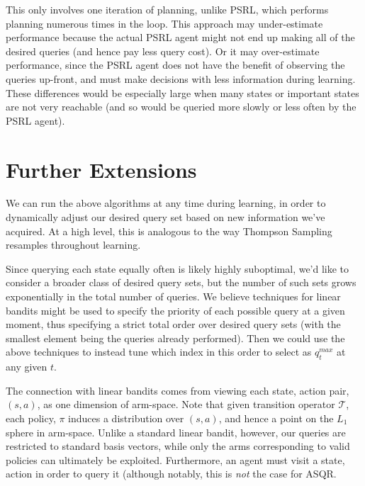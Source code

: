 \documentclass{article}
\begin{document}
This only involves one iteration of planning, unlike PSRL, which performs planning numerous times in the loop.
This approach may under-estimate performance because the actual PSRL agent might not end up making all of the desired queries (and hence pay less query cost).
Or it may over-estimate performance, since the PSRL agent does not have the benefit of observing the queries up-front, and must make decisions with less information during learning.
These differences would be especially large when many states or important states are not very reachable (and so would be queried more slowly or less often by the PSRL agent).

\section{Further Extensions}
We can run the above algorithms at any time during learning, in order to dynamically adjust our desired query set based on new information we've acquired.
At a high level, this is analogous to the way Thompson Sampling resamples throughout learning.

Since querying each state equally often is likely highly suboptimal, we'd like to consider a broader class of desired query sets, but the number of such sets grows exponentially in the total number of queries.
We believe techniques for linear bandits might be used to specify the priority of each possible query at a given moment, thus specifying a strict total order over desired query sets (with the smallest element being the queries already performed).
Then we could use the above techniques to instead tune which index in this order to select as $q^{max}_t$ at any given $t$.

The connection with linear bandits comes from viewing each state, action pair, $(s,a)$, as one dimension of arm-space.
Note that given transition operator $\mathcal{T}$, each policy, $\pi$ induces a distribution over $(s,a)$, and hence a point on the $L_1$ sphere in arm-space.
Unlike a standard linear bandit, however, our queries are restricted to standard basis vectors, while only the arms corresponding to valid policies can ultimately be exploited.
Furthermore, an agent must visit a state, action in order to query it (although notably, this is \emph{not} the case for ASQR.






%

\end{document}
